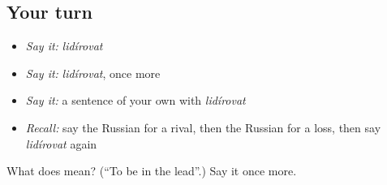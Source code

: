\subsection*{Your turn}
\begin{itemize}
\raggedright
  \item \emph{Say it:} \emph{lidírovat}
  \item \emph{Say it:} \emph{lidírovat}, once more
  \item \emph{Say it:} a sentence of your own with \emph{lidírovat}
  \item \emph{Recall:} say the Russian for a rival, then the Russian for a loss, then say \emph{lidírovat} again
\end{itemize}

\begin{tcolorbox}[breakable,colback=teal!4,colframe=teal!35!black,title={Before you move on}]
What does  mean? (\textquotedblleft{}To be in the lead\textquotedblright{}.) Say it once more.
\end{tcolorbox}
